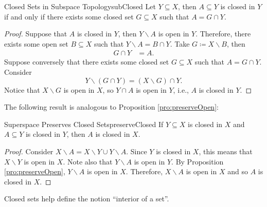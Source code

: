 \documentclass[math]{amznotes}
\makeatletter
\renewcommand{\mathring}[1]{\accentset{\circ}{#1}}
\let\save@mathaccent\mathaccent
\newcommand*\if@single[3]{%
  \setbox0\hbox{${\mathaccent"0362{#1}}^H$}%
  \setbox2\hbox{${\mathaccent"0362{\kern0pt#1}}^H$}%
  \ifdim\ht0=\ht2 #3\else #2\fi
  }
\newcommand*\rel@kern[1]{\kern#1\dimexpr\macc@kerna}
\newcommand*\widebar[1]{\@ifnextchar^{{\wide@bar{#1}{0}}}{\wide@bar{#1}{1}}}
\newcommand*\wide@bar[2]{\if@single{#1}{\wide@bar@{#1}{#2}{1}}{\wide@bar@{#1}{#2}{2}}}
\newcommand*\wide@bar@[3]{%
  \begingroup
  \def\mathaccent##1##2{%
    \let\mathaccent\save@mathaccent
    \if#32 \let\macc@nucleus\first@char \fi
    \setbox\z@\hbox{$\macc@style{\macc@nucleus}_{}$}%
    \setbox\tw@\hbox{$\macc@style{\macc@nucleus}{}_{}$}%
    \dimen@\wd\tw@
    \advance\dimen@-\wd\z@
    \divide\dimen@ 3
    \@tempdima\wd\tw@
    \advance\@tempdima-\scriptspace
    \divide\@tempdima 10
    \advance\dimen@-\@tempdima
    \ifdim\dimen@>\z@ \dimen@0pt\fi
    \rel@kern{0.6}\kern-\dimen@
    \if#31
      \overline{\rel@kern{-0.6}\kern\dimen@\macc@nucleus\rel@kern{0.4}\kern\dimen@}%
      \advance\dimen@0.4\dimexpr\macc@kerna
      \let\final@kern#2%
      \ifdim\dimen@<\z@ \let\final@kern1\fi
      \if\final@kern1 \kern-\dimen@\fi
    \else
      \overline{\rel@kern{-0.6}\kern\dimen@#1}%
    \fi
  }%
  \macc@depth\@ne
  \let\math@bgroup\@empty \let\math@egroup\macc@set@skewchar
  \mathsurround\z@ \frozen@everymath{\mathgroup\macc@group\relax}%
  \macc@set@skewchar\relax
  \let\mathaccentV\macc@nested@a
  \if#31
    \macc@nested@a\relax111{#1}%
  \else
    \def\gobble@till@marker##1\endmarker{}%
    \futurelet\first@char\gobble@till@marker#1\endmarker
    \ifcat\noexpand\first@char A\else
      \def\first@char{}%
    \fi
    \macc@nested@a\relax111{\first@char}%
  \fi
  \endgroup
}
\theoremstyle{remark}
\makeatother
\begin{document}
\begin{probox}{Closed Sets in Subspace Topology}{subClosed}
    Let $Y \subseteq X$, then $A \subseteq Y$ is closed in $Y$ if and only if there exists some closed set $G \subseteq X$ such that $A = G \cap Y$.
    \tcblower
    \begin{proof}
        Suppose that $A$ is closed in $Y$, then $Y \backslash A$ is open in $Y$. Therefore, there exists some open set $B \subseteq X$ such that $Y \backslash A = B \cap Y$. Take $G \coloneqq X \backslash B$, then 
        \begin{align*}
            G \cap Y & = A.
        \end{align*}
        Suppose conversely that there exists some closed set $G \subseteq X$ such that $A = G \cap Y$. Consider 
        \begin{equation*}
            Y \backslash \left(G \cap Y\right) = (X \backslash G) \cap Y.
        \end{equation*}
        Notice that $X \backslash G$ is open in $X$, so $Y \cap A$ is open in $Y$, i.e., $A$ is closed in $Y$.
    \end{proof}
\end{probox}
The following result is analogous to Proposition \ref{pro:preserveOpen}:
\begin{probox}{Superspace Preserves Closed Sets}{preserveClosed}
    If $Y \subseteq X$ is closed in $X$ and $A \subseteq Y$ is closed in $Y$, then $A$ is closed in $X$.
    \tcblower
    \begin{proof}
        Consider $X \backslash A = X \backslash Y \cup Y \backslash A$. Since $Y$ is closed in $X$, this means that $X \backslash Y$ is open in $X$. Note also that $Y \backslash A$ is open in $Y$. By Proposition \ref{pro:preserveOpen}, $Y \backslash A$ is open in $X$. Therefore, $X \backslash A$ is open in $X$ and so $A$ is closed in $X$.
    \end{proof}
\end{probox}
Closed sets help define the notion ``interior of a set''.
\end{document}
